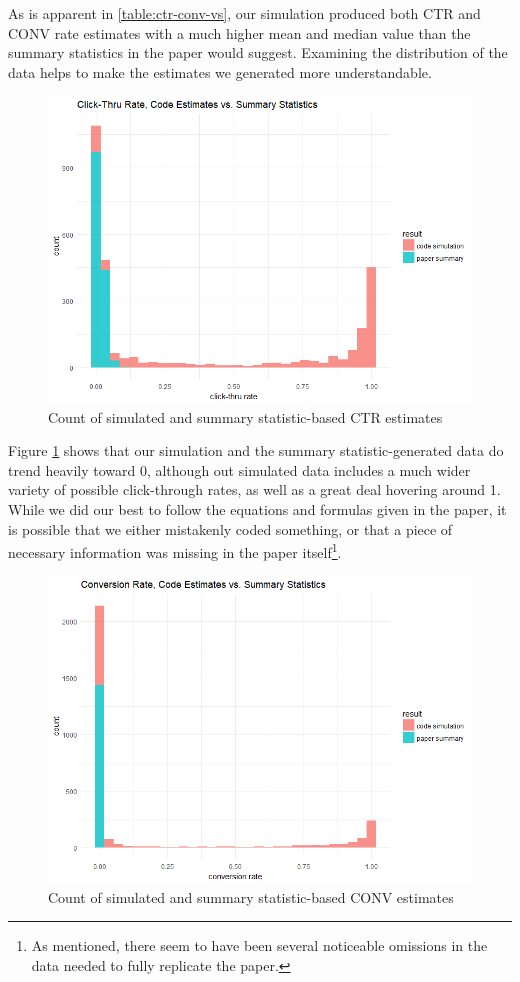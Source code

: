As is apparent in \ref{table:ctr-conv-vs}, our simulation produced both CTR and CONV rate estimates with a much higher mean and median value than the summary statistics in the paper would suggest. Examining the distribution of the data helps to make the estimates we generated more understandable. 
\begin{figure}[!h]
    \centering
    \includegraphics[scale = 0.65]{ctr_sim_code_plot.png}
    \caption{Count of simulated and summary statistic-based CTR estimates}
    \label{fig:CTR}
\end{figure}

Figure \ref{fig:CTR} shows that our simulation and the summary statistic-generated data do trend heavily toward 0, although out simulated data includes a much wider variety of possible click-through rates, as well as a great deal hovering around 1. While we did our best to follow the equations and formulas given in the paper, it is possible that we either mistakenly coded something, or that a piece of necessary information was missing in the paper itself\footnote{As mentioned, there seem to have been several noticeable omissions in the data needed to fully replicate the paper.}.

\begin{figure}[!h]
    \centering
    \includegraphics[scale = 0.6]{conv_sim_code_plot.png}
    \caption{Count of simulated and summary statistic-based CONV estimates}
    \label{fig:CONV}
\end{figure}

